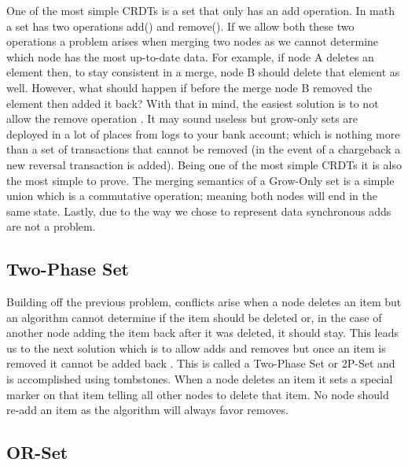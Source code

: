 \documentclass{article}
\begin{document}
\begin{multicols}{2}
\begin{refsection}
One of the most simple CRDTs is a set that only has an add operation. In math a set has two operations add() and remove(). If we allow both these two operations a problem arises when merging two nodes as we cannot determine which node has the most up-to-date data. For example, if node A deletes an element then, to stay consistent in a merge, node B should delete that element as well. However, what should happen if before the merge node B removed the element then added it back? With that in mind, the easiest solution is to not allow the remove operation \cite{shapiro_comprehensive_2011}. It may sound useless but grow-only sets are deployed in a lot of places from logs to your bank account; which is nothing more than a set of transactions that cannot be removed (in the event of a chargeback a new reversal transaction is added). Being one of the most simple CRDTs it is also the most simple to prove. The merging semantics of a Grow-Only set is a simple union which is a commutative operation; meaning both nodes will end in the same state. Lastly, due to the way we chose to represent data synchronous adds are not a problem.

\subsection*{Two-Phase Set}

Building off the previous problem, conflicts arise when a node deletes an item but an algorithm cannot determine if the item should be deleted or, in the case of another node adding the item back after it was deleted, it should stay. This leads us to the next solution which is to allow adds and removes but once an item is removed it cannot be added back \cite{shapiro_comprehensive_2011}. This is called a Two-Phase Set or 2P-Set and is accomplished using tombstones. When a node deletes an item it sets a special marker on that item telling all other nodes to delete that item. No node should re-add an item as the algorithm will always favor removes.


\subsection*{OR-Set}


\end{refsection}
\end{multicols}
\end{document}
